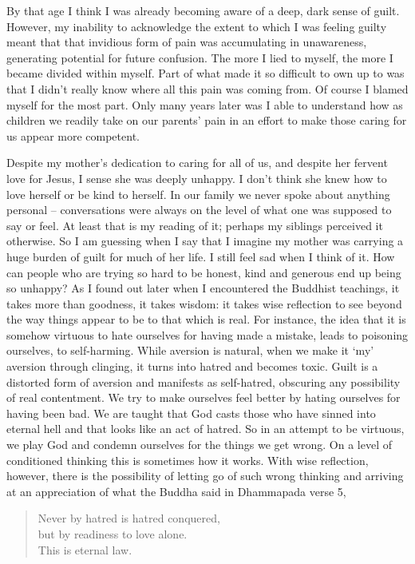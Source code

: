 By that age I think I was already becoming aware of a deep, dark sense
of guilt. However, my inability to acknowledge the extent to which I was
feeling guilty meant that that invidious form of pain was accumulating
in unawareness, generating potential for future confusion. The more I
lied to myself, the more I became divided within myself. Part of what
made it so difficult to own up to was that I didn't really know where
all this pain was coming from. Of course I blamed myself for the most
part. Only many years later was I able to understand how as children we
readily take on our parents' pain in an effort to make those caring for
us appear more competent.

Despite my mother's dedication to caring for all of us, and despite her
fervent love for Jesus, I sense she was deeply unhappy. I don't
think she knew how to love herself or be kind to herself. In our family
we never spoke about anything personal -- conversations were always on
the level of what one was supposed to say or feel. At least that is my
reading of it; perhaps my siblings perceived it otherwise. So I am
guessing when I say that I imagine my mother was carrying a huge burden
of guilt for much of her life. I still feel sad when I think of it. How
can people who are trying so hard to be honest, kind and generous end up
being so unhappy? As I found out later when I encountered the Buddhist
teachings, it takes more than goodness, it takes wisdom: it takes wise
reflection to see beyond the way things appear to be to that which is
real. For instance, the idea that it is somehow virtuous to hate
ourselves for having made a mistake, leads to poisoning ourselves, to
self-harming. While aversion is natural, when we make it `my' aversion
through clinging, it turns into hatred and becomes toxic. Guilt is a
distorted form of aversion and manifests as self-hatred, obscuring any
possibility of real contentment. We try to make ourselves feel better by
hating ourselves for having been bad. We are taught that God casts those
who have sinned into eternal hell and that looks like an act of hatred.
So in an attempt to be virtuous, we play God and condemn ourselves for
the things we get wrong. On a level of conditioned thinking this is
sometimes how it works. With wise reflection, however, there is the
possibility of letting go of such wrong thinking and arriving at an
appreciation of what the Buddha said in Dhammapada verse 5,

\enlargethispage{\baselineskip}

\begin{quote}
  Never by hatred is hatred conquered,\\
  but by readiness to love alone.\\
  This is eternal law.\cite{dhammapada}
\end{quote}

